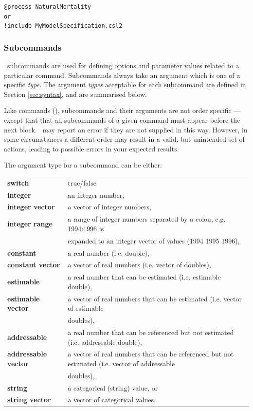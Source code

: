 {\small{\begin{verbatim}
@process NaturalMortality
or
!include MyModelSpecification.csl2
		\end{verbatim}}}

\subsubsection{Subcommands}

\CNAME\ subcommands are used for defining options and parameter values related to a particular command. Subcommands always take an argument which is one of a specific \emph{type}. The argument \emph{types} acceptable for each subcommand are defined in Section \ref{sec:syntax}, and are summarised below.

Like commands (), subcommands and their arguments are not order specific --- except that that all subcommands of a given command must appear before the next  block. \CNAME\ may report an error if they are not supplied in this way. However, in some circumstances a different order may result in a valid, but unintended set of actions, leading to possible errors in your expected results.

The argument type for a subcommand can be either:

\begin{tabular}{ll}
\textbf{switch} & true/false\\
\textbf{integer}& an integer number,\\
\textbf{integer vector} & a vector of integer numbers,\\
\textbf{integer range} & a range of integer numbers separated by a colon, e.g. 1994:1996 is \\ & expanded to an integer vector of values (1994 1995 1996),\\
\textbf{constant} & a real number (i.e. double),\\
\textbf{constant vector} & a vector of real numbers (i.e. vector of doubles),\\
\textbf{estimable} & a real number that can be estimated (i.e. estimable double),\\
\textbf{estimable vector} & a vector of real numbers that can be estimated (i.e. vector of estimable \\ & doubles),\\
\textbf{addressable} & a real number that can be referenced but not estimated (i.e. addressable double),\\
\textbf{addressable vector} & a vector of real numbers that can be referenced but not estimated (i.e. vector of addressable \\ & doubles),\\
\textbf{string} & a categorical (string) value, or\\
\textbf{string vector} & a vector of categorical values.
\end{tabular}

